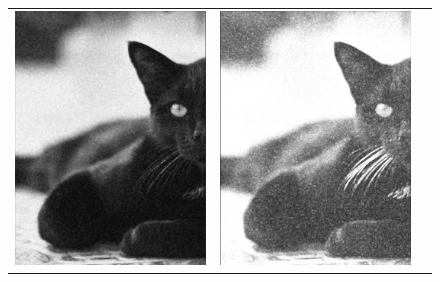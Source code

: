 	\begin{landscape}
		\hfill\break
		\hfill\break
		\hfill\break
		\hfill\break
		\begin{figure}[!h]
			\centering
			\begin{tabular}{ccc}
				\includegraphics[width=8cm]{Imagenes/Ruido_Gauss_5_50_mediana_5.png} & \includegraphics[width=8cm]{Imagenes/Ruido_Gauss_5_50_max_5.png} &

\end{tabular}
\end{figure}
\end{landscape}

